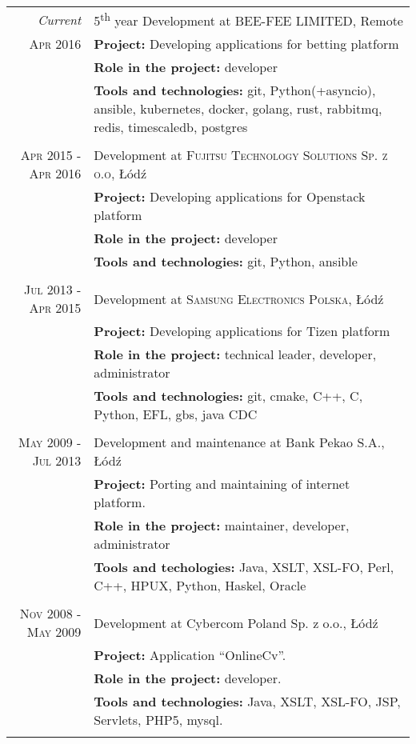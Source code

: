 \documentclass[a4paper,9pt]{article} %
\begin{document}
\begin{longtable}{r|p{11cm}}
\emph{Current} & 5\textsuperscript{th} year Development at \textsc{BEE-FEE LIMITED}, Remote \\
\textsc{Apr 2016} & \textbf{Project:} Developing applications for betting platform\\
& \textbf{Role in the project:} developer\\
& \textbf{Tools and technologies:} git, Python(+asyncio), ansible, kubernetes, docker,
golang, rust, rabbitmq, redis, timescaledb, postgres\\
\multicolumn{2}{c}{} \\

\textsc{Apr 2015 - Apr 2016} & Development at \textsc{Fujitsu Technology Solutions Sp. z o.o}, Łódź \\
& \textbf{Project:} Developing applications for Openstack platform\\
& \textbf{Role in the project:} developer\\
& \textbf{Tools and technologies:} git, Python, ansible\\
\multicolumn{2}{c}{} \\

\textsc{Jul 2013 - Apr 2015} & Development at \textsc{Samsung Electronics Polska}, Łódź \\
& \textbf{Project:} Developing applications for Tizen platform\\
& \textbf{Role in the project:} technical leader, developer, administrator\\
& \textbf{Tools and technologies:} git, cmake, C++, C, Python, EFL, gbs, java CDC\\
\multicolumn{2}{c}{} \\

\textsc{May 2009 - Jul 2013} & Development and maintenance at Bank Pekao S.A., Łódź\\
& \textbf{Project:} Porting and maintaining of internet platform.\\
& \textbf{Role in the project:} maintainer, developer, administrator\\
& \textbf{Tools and techologies:} Java, XSLT, XSL-FO, Perl, C++, HPUX, Python, Haskel, Oracle\\
\multicolumn{2}{c}{} \\

\textsc{Nov 2008 - May 2009} & Development at Cybercom Poland Sp. z o.o., Łódź\\
& \textbf{Project:} Application “OnlineCv”.\\
& \textbf{Role in the project:} developer.\\
& \textbf{Tools and technologies:} Java, XSLT, XSL-FO, JSP, Servlets, PHP5, mysql.\\
\multicolumn{2}{c}{} \\


\end{longtable}
\end{document}
